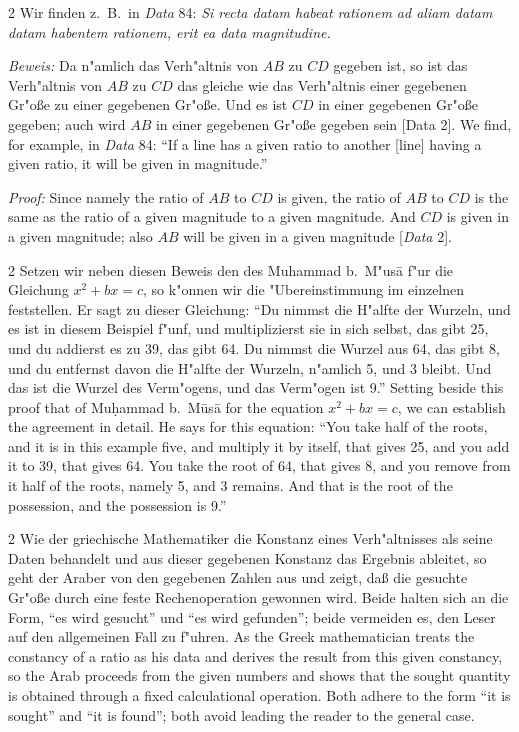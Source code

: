 \documentclass[10pt,a4paper]{article}
\renewcommand{\switchcolumn}{\syncronize\nointerlineskip\columnbreak}
\newcommand{\enquote}[1]{``#1''}
\begin{document}
\begin{paracol}{2}
Wir finden z.\ B.\ in \textit{Data} 84: \textit{Si recta datam habeat rationem ad aliam datam datam habentem rationem, erit ea data magnitudine.}

\textit{Beweis:} Da n"amlich das Verh"altnis von $AB$ zu $CD$ gegeben ist, so ist das Verh"altnis von $AB$ zu $CD$ das gleiche wie das Verh"altnis einer gegebenen Gr"o\ss{}e zu einer gegebenen Gr"o\ss{}e. Und es ist $CD$ in einer gegebenen Gr"o\ss{}e gegeben; auch wird $AB$ in einer gegebenen Gr"o\ss{}e gegeben sein [Data 2].
\switchcolumn
We find, for example, in \textit{Data} 84: ``If a line has a given ratio to another [line] having a given ratio, it will be given in magnitude.''

\textit{Proof:} Since namely the ratio of $AB$ to $CD$ is given, the ratio of $AB$ to $CD$ is the same as the ratio of a given magnitude to a given magnitude. And $CD$ is given in a given magnitude; also $AB$ will be given in a given magnitude [\textit{Data} 2].
\end{paracol}

\begin{paracol}{2}
Setzen wir neben diesen Beweis den des Muhammad b.\ M"us\=a f"ur die Gleichung $x^{2} + bx = c$, so k"onnen wir die "Ubereinstimmung im einzelnen feststellen. Er sagt zu dieser Gleichung: \enquote{Du nimmst die H"alfte der Wurzeln, und es ist in diesem Beispiel f"unf, und multiplizierst sie in sich selbst, das gibt 25, und du addierst es zu 39, das gibt 64. Du nimmst die Wurzel aus 64, das gibt 8, und du entfernst davon die H"alfte der Wurzeln, n"amlich 5, und 3 bleibt. Und das ist die Wurzel des Verm"ogens, und das Verm"ogen ist 9.}
\switchcolumn
Setting beside this proof that of Mu\d{h}ammad b.\ M\=us\=a for the equation $x^{2} + bx = c$, we can establish the agreement in detail. He says for this equation: ``You take half of the roots, and it is in this example five, and multiply it by itself, that gives 25, and you add it to 39, that gives 64. You take the root of 64, that gives 8, and you remove from it half of the roots, namely 5, and 3 remains. And that is the root of the possession, and the possession is 9.''
\end{paracol}

\begin{paracol}{2}
Wie der griechische Mathematiker die Konstanz eines Verh"altnisses als seine Daten behandelt und aus dieser gegebenen Konstanz das Ergebnis ableitet, so geht der Araber von den gegebenen Zahlen aus und zeigt, da\ss{} die gesuchte Gr"o\ss{}e durch eine feste Rechenoperation gewonnen wird. Beide halten sich an die Form, \enquote{es wird gesucht} und \enquote{es wird gefunden}; beide vermeiden es, den Leser auf den allgemeinen Fall zu f"uhren.
\switchcolumn
As the Greek mathematician treats the constancy of a ratio as his data and derives the result from this given constancy, so the Arab proceeds from the given numbers and shows that the sought quantity is obtained through a fixed calculational operation. Both adhere to the form ``it is sought'' and ``it is found''; both avoid leading the reader to the general case.
\end{paracol}
\end{document}
